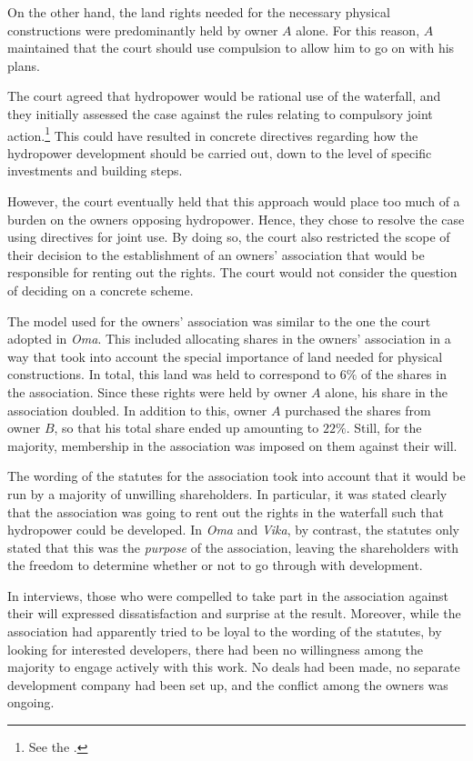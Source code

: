 On the other hand, the land rights needed for the necessary physical constructions were predominantly held by owner $A$ alone. For this reason, $A$ maintained that the court should use compulsion to allow him to go on with his plans. 

The court agreed that hydropower would be rational use of the waterfall, and they initially assessed the case against the rules relating to compulsory joint action.\footnote{See the  \cite[2 e)]{lca79}.} This could have resulted in concrete directives regarding how the hydropower development should be carried out, down to the level of specific investments and building steps. 

However, the court eventually held that this approach would place too much of a burden on the owners opposing hydropower. Hence, they chose to resolve the case using directives for joint use. By doing so, the court also restricted the scope of their decision to the establishment of an owners' association that would be responsible for renting out the rights. The court would not consider the question of deciding on a concrete scheme.

The model used for the owners' association was similar to the one the court adopted in \emph{Oma}. This included allocating shares in the owners' association in a way that took into account the special importance of land needed for physical constructions. In total, this land was held to correspond to $6 \%$ of the shares in the association. Since these rights were held by owner $A$ alone, his share in the association doubled. In addition to this, owner $A$ purchased the shares from owner $B$, so that his total share ended up amounting to $22 \%$. Still, for the majority, membership in the association was imposed on them against their will.

The wording of the statutes for the association took into account that it would be run by a majority of unwilling shareholders. In particular, it was stated clearly that the association was going to rent out the rights in the waterfall such that hydropower could be developed. In \emph{Oma} and \emph{Vika}, by contrast, the statutes only stated that this was the \emph{purpose} of the association, leaving the shareholders with the freedom to determine whether or not to go through with development.

In interviews, those who were compelled to take part in the association against their will expressed dissatisfaction and surprise at the result. Moreover, while the association had apparently tried to be loyal to the wording of the statutes, by looking for interested developers, there had been no willingness among the majority to engage actively with this work. No deals had been made, no separate development company had been set up, and the conflict among the owners was ongoing. 


